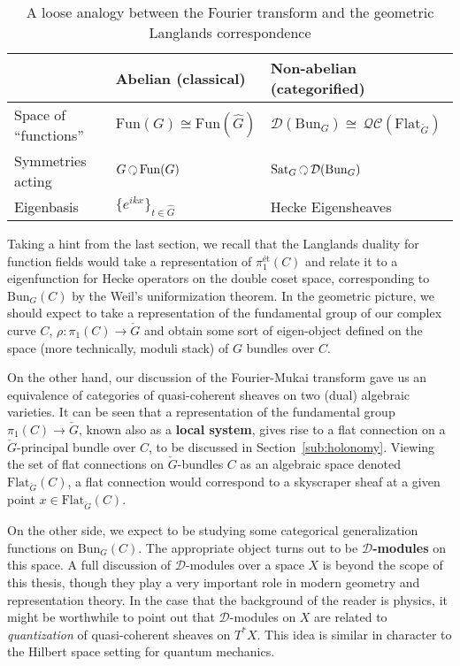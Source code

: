  
\begin{table}[h!]
	\centering
\begin{tabularx}{\textwidth}{|>{\hsize}Y|Y|>{\hsize}Y|}
	\hline
	& Abelian (classical) & Non-abelian (categorified)\\
	\hline
	Space of ``functions'' & $\mathrm{Fun}(G) \cong \mathrm{Fun}(\hat G)$ & $\mathcal D (\mathrm{Bun}_G) \cong \, \mathcal{QC}(\mathrm{Flat}_{\check G})$\\
	Symmetries acting & $G \lacts \mathrm{Fun}(G)$ & $\mathrm{Sat}_G \lacts \mathcal D (\mathrm{Bun}_G)$\\
	Eigenbasis & $\{e^{ikx}\}_{t \in \hat G}$ & Hecke Eigensheaves\\
	\hline
	\end{tabularx}
\caption{A loose analogy between the Fourier transform and the geometric Langlands correspondence}
\label{tab:geometric_langlands}
\end{table}


Taking a hint from the last section, we recall that the Langlands duality for function fields would take a representation of $\pi_1^{\text{\'et}}(C)$ and relate it to a eigenfunction for Hecke operators on the double coset space, corresponding to $\mathrm{Bun}_G(C)$ by the Weil's uniformization theorem. 
In the geometric picture, we should expect to take a representation of the fundamental group of our complex curve $C$, $\rho: \pi_1(C) \to \check G$ and obtain some sort of eigen-object defined on the space (more technically, moduli stack) of $G$ bundles over $C$. 

On the other hand, our discussion of the Fourier-Mukai transform gave us an equivalence of categories of quasi-coherent sheaves on two (dual) algebraic varieties. It can be seen that a representation of the fundamental group $\pi_1 (C) \to \check G$, known also as a \textbf{local system}, gives rise to a flat connection on a $\check G$-principal bundle over $C$, to be discussed in Section~\ref{sub:holonomy}. Viewing the set of flat connections on $\check G$-bundles $C$ as an algebraic space denoted $\mathrm{Flat}_{\check G} (C)$, a flat connection would correspond to a skyscraper sheaf at a given point $x \in \mathrm{Flat}_{\check G} (C)$. 

On the other side, we expect to be studying some categorical generalization functions on $\mathrm{Bun}_G(C)$. The appropriate object turns out to be \textbf{$\mathcal D$-modules} on this space.
A full discussion of $\mathcal D$-modules over a space $X$ is beyond the scope of this thesis, though they play a very important role in modern geometry and representation theory. In the case that the background of the reader is physics, it might be worthwhile to point out that $\mathcal D$-modules on $X$ are related to \emph{quantization} of quasi-coherent sheaves on $T^* X$. This idea is similar in character to the Hilbert space setting for quantum mechanics.


